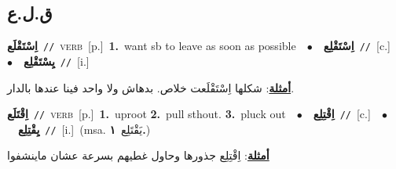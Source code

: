 \documentclass[10pt,a4paper,twoside]{article} %
\begin{document}
\begin{multicols}{2}
\vspace{-3mm}
\subsection*{\color{blue}\foreignlanguage{arabic}{ق.ل.ع}\color{blue}{}} 

{\setlength\topsep{0pt}\textbf{\foreignlanguage{arabic}{اِسْتَقْلَع}}\ {\color{gray}\texttt{//}\color{black}}\ \textsc{verb}\ [p.]\ \textbf{1.}~want sb to leave as soon as possible\ \ $\bullet$\ \ \setlength\topsep{0pt}\textbf{\foreignlanguage{arabic}{اِسْتَقْلِع}}\ {\color{gray}\texttt{//}\color{black}}\ [c.]\ \ $\bullet$\ \ \setlength\topsep{0pt}\textbf{\foreignlanguage{arabic}{يِسْتَقْلِع}}\ {\color{gray}\texttt{//}\color{black}}\ [i.]\  \begin{flushright}\color{gray}\foreignlanguage{arabic}{\textbf{\underline{\foreignlanguage{arabic}{أمثلة}}}: شكلها اِسْتَقْلَعت خلاص. بدهاش ولا واحد فينا عندها بالدار.}\end{flushright}\color{black}} \vspace{2mm}

{\setlength\topsep{0pt}\textbf{\foreignlanguage{arabic}{اِقْتَلَع}}\ {\color{gray}\texttt{//}\color{black}}\ \textsc{verb}\ [p.]\ \textbf{1.}~uproot  \textbf{2.}~pull sthout.  \textbf{3.}~pluck out\ \ $\bullet$\ \ \setlength\topsep{0pt}\textbf{\foreignlanguage{arabic}{اِقْتِلِع}}\ {\color{gray}\texttt{//}\color{black}}\ [c.]\ \ $\bullet$\ \ \setlength\topsep{0pt}\textbf{\foreignlanguage{arabic}{يِقْتِلِع}}\ {\color{gray}\texttt{//}\color{black}}\ [i.]\ \color{gray}(msa. \foreignlanguage{arabic}{يَقْتَلِع}~\foreignlanguage{arabic}{\textbf{١.}})\color{black}\  \begin{flushright}\color{gray}\foreignlanguage{arabic}{\textbf{\underline{\foreignlanguage{arabic}{أمثلة}}}: اِقْتِلِع جذورها  وحاول غطيهم بسرعة عشان ماينشفوا}\end{flushright}\color{black}} \vspace{2mm}


\end{multicols}
\end{document}
